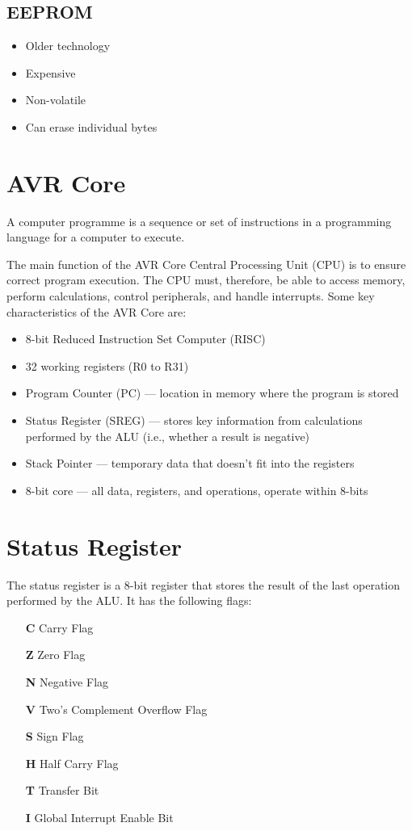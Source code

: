\documentclass{report}
\begin{document}
\subsection{EEPROM}
\begin{itemize}
    \item Older technology
    \item Expensive
    \item Non-volatile
    \item Can erase individual bytes
\end{itemize}
\section{AVR Core}
\begin{definition}
    A computer programme is a sequence or set of \linebreak instructions in a programming language
    for a computer to execute.
\end{definition}
The main function of the AVR Core Central Processing Unit (CPU) is to ensure correct program execution.
The CPU must, therefore, be able to access memory, perform calculations, control peripherals, and handle interrupts.
Some key characteristics of the AVR Core are:
\begin{itemize}
    \item 8-bit Reduced Instruction Set Computer (RISC)
    \item 32 working registers (R0 to R31)
    \item Program Counter (PC) --- location in memory where the program is stored
    \item Status Register (SREG) --- stores key information from calculations performed by the ALU (i.e., whether a result is negative)
    \item Stack Pointer --- temporary data that doesn't fit into the registers
    \item 8-bit core --- all data, registers, and operations, operate within 8-bits
\end{itemize}
\section{Status Register}
The status register is a 8-bit register that stores the result of the last operation performed by the ALU.
It has the following flags:
\begin{itemize}
    \item[\textbf{C}] Carry Flag
    \item[\textbf{Z}] Zero Flag
    \item[\textbf{N}] Negative Flag
    \item[\textbf{V}] Two's Complement Overflow Flag
    \item[\textbf{S}] Sign Flag
    \item[\textbf{H}] Half Carry Flag
    \item[\textbf{T}] Transfer Bit
    \item[\textbf{I}] Global Interrupt Enable Bit
\end{itemize}
\end{document}

